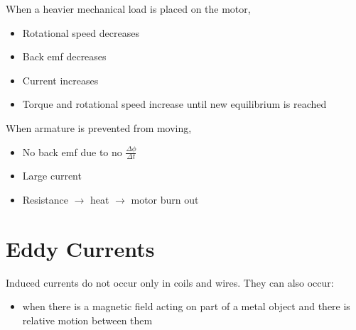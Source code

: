 	When a heavier mechanical load is placed on the motor,

	\begin{itemize}
		\item Rotational speed decreases
		\item Back emf decreases
		\item Current increases
		\item Torque and rotational speed increase until new equilibrium is reached
	\end{itemize}

	When armature is prevented from moving,
	\begin{itemize}
		\item No back emf due to no $\frac{\Delta \phi}{\Delta t}$
		\item Large current
		\item Resistance $\rightarrow$ heat $\rightarrow$ motor burn out
	\end{itemize}

\section{Eddy Currents} \label{12/03/2025}

	Induced currents do not occur only in coils and wires. They can also occur:

	\begin{itemize}
		\item when there is a magnetic field acting on part of a metal object and there is relative motion between them
	\end{itemize}
